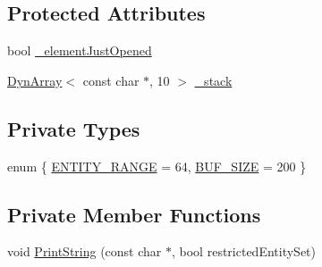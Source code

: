 \subsection*{Protected Attributes}
\begin{DoxyCompactItemize}
\item 
bool \hyperlink{classtinyxml2_1_1_x_m_l_printer_ac07169d58b465214a2b1fa306e617c26}{\-\_\-element\-Just\-Opened}
\item 
\hyperlink{classtinyxml2_1_1_dyn_array}{Dyn\-Array}$<$ const char $\ast$, 10 $>$ \hyperlink{classtinyxml2_1_1_x_m_l_printer_a99d59e67e084714541bee3ae43884bef}{\-\_\-stack}
\end{DoxyCompactItemize}
\subsection*{Private Types}
\begin{DoxyCompactItemize}
\item 
enum \{ \hyperlink{classtinyxml2_1_1_x_m_l_printer_abd08e8da55b22d059d0484c53db1fae8a2ddc02813235fe451809606959166db5}{E\-N\-T\-I\-T\-Y\-\_\-\-R\-A\-N\-G\-E} = 64, 
\hyperlink{classtinyxml2_1_1_x_m_l_printer_abd08e8da55b22d059d0484c53db1fae8a1f747a8fb39ceb2e711c3798058fb632}{B\-U\-F\-\_\-\-S\-I\-Z\-E} = 200
 \}
\end{DoxyCompactItemize}
\subsection*{Private Member Functions}
\begin{DoxyCompactItemize}
\item 
void \hyperlink{classtinyxml2_1_1_x_m_l_printer_a5495e504053f63f2c4d603327314fa91}{Print\-String} (const char $\ast$, bool restricted\-Entity\-Set)
\end{DoxyCompactItemize}

